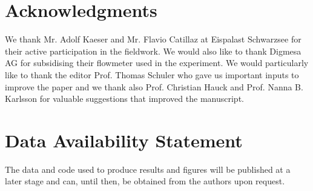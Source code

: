 \documentclass[utf8]{frontiersSCNS} %
\begin{document}
\section*{Acknowledgments} We thank Mr. Adolf Kaeser and Mr. Flavio Catillaz at Eispalast Schwarzsee for their active
participation in the fieldwork. We would also like to thank Digmesa AG for subsidising their flowmeter used in the
experiment. We would particularly like to thank the editor Prof. Thomas Schuler who gave us important inputs to
improve the paper and we thank also Prof. Christian Hauck and Prof. Nanna B. Karlsson for valuable suggestions that
improved the manuscript.


\section*{Data Availability Statement} The data and code used to produce results and figures will be published at a
later stage and can, until then, be obtained from the authors upon request.

 
\end{document}
